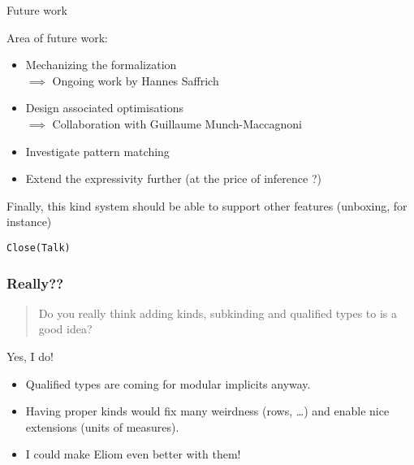 \documentclass[xcolor=svgnames,11pt]{beamer}
\begin{document}
\begin{frame}{Future work}

  Area of future work:
  \begin{itemize}
  \item Mechanizing the formalization\\
    $\implies$ Ongoing work by Hannes Saffrich
  \item Design associated optimisations\\
    $\implies$ Collaboration with Guillaume Munch-Maccagnoni
  \item Investigate pattern matching
  \item Extend the expressivity further (at the price of inference ?)
  \end{itemize}

  Finally, this kind system should be able to support other features
  (unboxing, for instance)
\end{frame}

\begin{frame}
  \Huge{\texttt{Close(Talk)}}
\end{frame}

\begin{frame}
  \frametitle{Really??}

  \begin{quote}
    Do you really think adding kinds, subkinding and qualified types to \ocaml is a good idea?
  \end{quote}\pause
  Yes, I do!\pause
  \begin{itemize}
  \item Qualified types are coming for modular implicits anyway.
  \item Having proper kinds would fix many weirdness (rows, \dots) and
    enable nice extensions (units of measures).\pause
  \item I could make Eliom even better with them! \smiley{}
  \end{itemize}
\end{frame}





\end{document}
